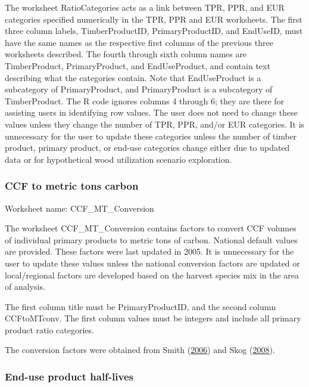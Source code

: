 \documentclass[
  openany]{book}
\begin{document}
The worksheet RatioCategories acts as a link between TPR, PPR, and EUR
categories specified numerically in the TPR, PPR and EUR worksheets. The
first three column labels, TimberProductID, PrimaryProductID, and
EndUseID, must have the same names as the respective first columns of
the previous three worksheets described. The fourth through sixth column
names are TimberProduct, PrimaryProduct, and EndUseProduct, and contain
text describing what the categories contain. Note that EndUseProduct is
a subcategory of PrimaryProduct, and PrimaryProduct is a subcategory of
TimberProduct. The R code ignores columns 4 through 6; they are there
for assisting users in identifying row values. The user does not need to
change these values unless they change the number of TPR, PPR, and/or
EUR categories. It is unnecessary for the user to update these
categories unless the number of timber product, primary product, or
end-use categories change either due to updated data or for hypothetical
wood utilization scenario exploration.

\hypertarget{own-prov-input-ccfMTC}{%
\subsubsection{CCF to metric tons carbon}\label{own-prov-input-ccfMTC}}

Worksheet name: CCF\_MT\_Conversion

The worksheet CCF\_MT\_Conversion contains factors to convert CCF
volumes of individual primary products to metric tons of carbon.
National default values are provided. These factors were last updated in
2005. It is unnecessary for the user to update these values unless the
national conversion factors are updated or local/regional factors are
developed based on the harvest species mix in the area of analysis.

The first column title must be PrimaryProductID, and the second column
CCFtoMTconv. The first column values must be integers and include all
primary product ratio categories.

The conversion factors were obtained from Smith
(\protect\hyperlink{ref-smith2006}{2006}) and Skog
(\protect\hyperlink{ref-skog2008}{2008}).

\hypertarget{own-prov-input-euhl}{%
\subsubsection{End-use product half-lives}\label{own-prov-input-euhl}}
\end{document}
